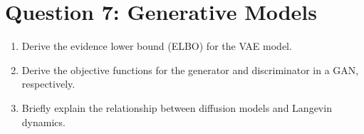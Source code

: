 \documentclass[
	12pt, %
]{fphw}
\begin{document}
\section*{Question 7: Generative Models}

\begin{problem}
	\begin{enumerate}
	\item Derive the evidence lower bound (ELBO) for the VAE model. 

    \item Derive the objective functions for the generator and discriminator in a GAN, respectively. 
    

    \item Briefly explain the relationship between diffusion models and Langevin dynamics.  
\end{enumerate}
\end{problem}
\end{document}
